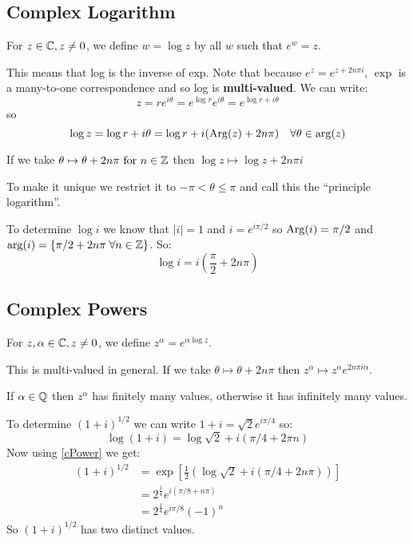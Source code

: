 \documentclass[../main.tex]{subfiles}
\begin{document}
\subsection{Complex Logarithm}
\begin{definition}
  For $z \in \mathbb{C}, z \neq 0$, we define $w = \log z$ by all $w$ such that $e^{w} = z$.
\end{definition}
This means that log is the inverse of exp.
Note that because $e^{z} = e^{z + 2n\pi i}$, $\exp$ is a many-to-one correspondence and so log is \textbf{multi-valued}.
We can write:
\[
  z = re^{i\theta} = e^{\log r} e^{i \theta} = e^{\log r + i\theta}
\]
so
\[
  \log z = \log r + i\theta = \log r + i(\operatorname{Arg}(z) + 2n\pi)\quad\forall \theta \in \arg(z)
\]
\begin{remark}
  If we take $\theta \mapsto \theta + 2n\pi \text{ for } n \in \mathbb{Z}$ then $\log z \mapsto \log z + 2n\pi i$

  To make it unique we restrict it to $-\pi < \theta \leq \pi$ and call this the ``principle logarithm''.
\end{remark}
\begin{example}
  To determine $\log i$ we know that $|i| = 1$ and $i = e^{i\pi/2}$ so $\operatorname{Arg}(i) = \pi/2$ and $\arg(i) = \{\pi/2 + 2n\pi\;\forall n \in \mathbb{Z}\}$. So:
  \[
    \log i = i\left(\frac{\pi}{2} + 2n\pi\right)
  \]
\end{example}
\subsection{Complex Powers}
\begin{definition}
  For $z, \alpha \in \mathbb{C}, z\neq0$, we define $z^{\alpha} = e^{\alpha \log z}$.
  \label{cPower}
\end{definition}
This is multi-valued in general.
If we take $\theta \mapsto \theta + 2n\pi$ then $z^{\alpha} \mapsto z^{\alpha}e^{2n\pi i \alpha}$.
\begin{remark}
  If $\alpha \in \mathbb{Q}$ then $z^{\alpha}$ has finitely many values, otherwise it has infinitely many values.
\end{remark}
\begin{example}
  To determine $(1 + i)^{1/2}$ we can write $1 + i = \sqrt{2}e^{i\pi/4}$ so:
  \[
    \log(1 + i) = \log \sqrt{2} + i(\pi/4 + 2\pi n)
  \]
  Now using \cref{cPower} we get:
  \begin{align*}
    (1 + i)^{1/2} &= \exp\left[\frac{1}{2}\left(\log \sqrt{2} + i(\pi/4 + 2n\pi)\right)\right] \\
                  &= 2^{\frac{1}{4}} e^{i(\pi/8 + n\pi)} \\
                  &= 2^{\frac{1}{4}} e^{i\pi/8} (-1)^{n}
  \end{align*}
  So $(1 + i)^{1/2}$ has two distinct values.
\end{example}
\end{document}
